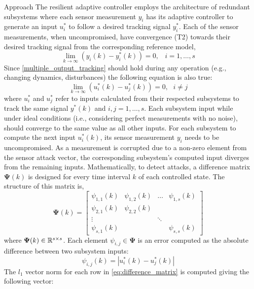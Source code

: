 \begin{section}{Approach}
The resilient adaptive controller employs the architecture of redundant subsystems where each sensor measurement $y_i$ has its adaptive controller to generate an input $u^*_i$ to follow a desired tracking signal $y^*_i$. Each of the sensor measurements, when uncompromised, have convergence (T2) towards their desired tracking signal from the corresponding reference model,
    \begin{equation}
    \label{multiple_output_tracking}
    \lim_{k\to\infty}(y_i(k)-y^*_i(k))=0, \;\;\; i=1,\dots,s
    \end{equation}
Since \eqref{multiple_output_tracking} should hold during any operation (e.g., changing dynamics, disturbances) the following equation is also true:
\begin{equation}
    \label{eq:u_to_0}
    \lim_{k\to\infty}(u^*_i(k)-u^*_j(k))=0, \text{ }i\neq j
\end{equation}
where $u^*_i$ and $u^*_j$ refer to inputs calculated from their respected subsystems to track the same signal $y^*(k)$ and $i,j = 1,\dots,s$. Each subsystem input while under ideal conditions (i.e., considering perfect measurements with no noise), should converge to the same value as all other inputs. For each subsystem to compute the next input $u^*_i(k)$, its sensor measurement $y_i$ needs to be uncompromised. As a measurement is corrupted due to a non-zero element from the sensor attack vector, the corresponding subsystem's computed input diverges from the remaining inputs. Mathematically, to detect attacks, a difference matrix $\bm{\Psi}(k)$ is designed for every time interval $k$ of each controlled state. The structure of this matrix is,
    \begin{equation}
    \label{eq:difference_matrix}
	\bm{\Psi}(k)=\begin{bmatrix} \psi_{1,1}(k) & \psi_{1,2}(k) & \dots & \psi_{1,s}(k) \\ \psi_{2,1}(k) & \psi_{2,2}(k) &  &  \\ \vdots &  & \ddots &  \\ \psi_{s,1}(k) &  &  & \psi_{s,s}(k) \end{bmatrix}
	\end{equation}
where $\bm{\Psi}(k) \in \mathbb{R}^{s\times s}$. Each element $\psi_{i,j}\in\bm{\Psi}$ is an error computed as the absolute difference between two subsystem inputs:
    \begin{equation}
        \label{eq:input_diff}
        \psi_{i,j}(k)=|u^*_i(k)-u^*_j(k)|
    \end{equation}
The $l_1$ vector norm for each row in \eqref{eq:difference_matrix} is computed giving the following vector:


\end{section}
